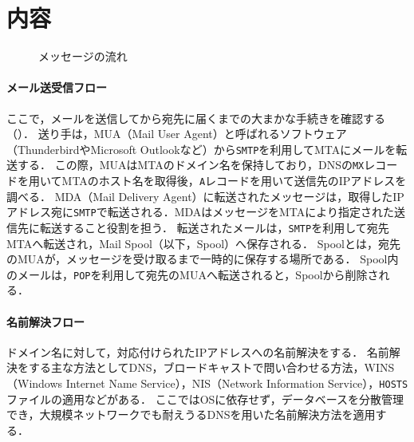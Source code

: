 \section{内容}
\begin{wrapfigure}{r}[0mm]{.48\textwidth}
    \vspace{-.5cm}
    
    \caption{メッセージの流れ\footnotemark[1]}
    \label{fig:メール送受信フロー}
    \vspace{-.5cm}
\end{wrapfigure}
\newcommand{\smtp}{\texttt{SMTP}}
\newcommand{\pop}{\texttt{POP}}
\newcommand{\imap}{\texttt{IMAP}}
\paragraph{メール送受信フロー}
ここで，メールを送信してから宛先に届くまでの大まかな手続きを確認する（）．
送り手は，MUA（Mail User Agent）と呼ばれるソフトウェア（ThunderbirdやMicrosoft Outlookなど）から\smtp を利用してMTAにメールを転送する．
この際，MUAはMTAのドメイン名を保持しており，DNSの\texttt{MX}レコードを用いてMTAのホスト名を取得後，\texttt{A}レコードを用いて送信先のIPアドレスを調べる．
MDA（Mail Delivery Agent）に転送されたメッセージは，取得したIPアドレス宛に\smtp で転送される．MDAはメッセージをMTAにより指定された送信先に転送すること役割を担う．
転送されたメールは，\smtp を利用して宛先MTAへ転送され，Mail Spool（以下，Spool）へ保存される．
Spoolとは，宛先のMUAが，メッセージを受け取るまで一時的に保存する場所である．
Spool内のメールは，\pop を利用して宛先のMUAへ転送されると，Spoolから削除される．
\hfill\cite[p.9\ -\ p.11, p.13]{2004postfix詳解}
\paragraph{名前解決フロー}
ドメイン名に対して，対応付けられたIPアドレスへの名前解決をする．
名前解決をする主な方法としてDNS，ブロードキャストで問い合わせる方法\cite[p.135]{いちばんやさしいネットワークの本}，WINS（Windows Internet Name Service），NIS（Network Information Service），\texttt{HOSTS}ファイルの適用などがある．
ここではOSに依存せず，データベースを分散管理でき，大規模ネットワークでも耐えうるDNSを用いた名前解決方法を適用する．

